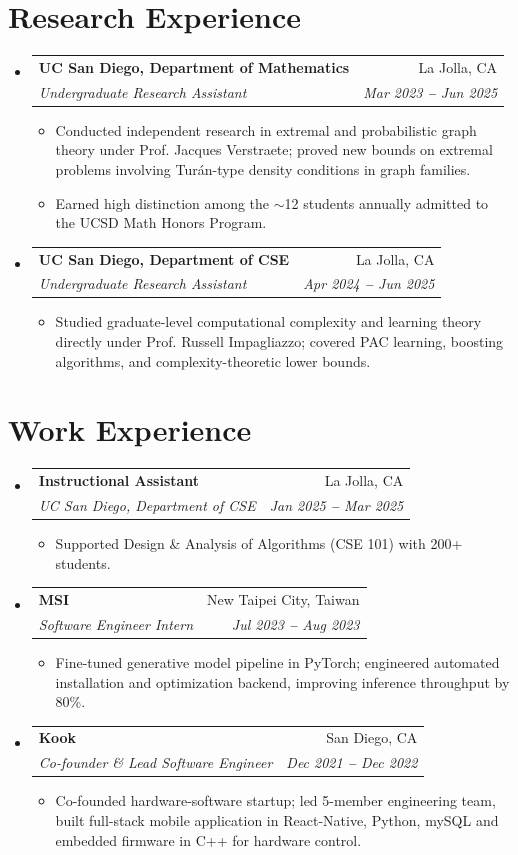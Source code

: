 \documentclass[letterpaper,11pt]{article}
\makeatletter
\newcommand{\resumeItem}[1]{
  \item\small{
    {#1 \vspace{-1pt}}
  }
}
\newcommand{\resumeSubheading}[4]{
  \vspace{-2pt}\item
    \begin{tabular*}{0.97\textwidth}[t]{l@{\extracolsep{\fill}}r}
      \textbf{#1} & #2 \\
      \textit{\small#3} & \textit{\small #4} \\
    \end{tabular*}\vspace{-2pt}
}
\newcommand{\resumeSubHeadingListStart}{\begin{itemize}[leftmargin=0.15in, label={}]}
\newcommand{\resumeSubHeadingListEnd}{\end{itemize}}
\newcommand{\resumeItemListStart}{\begin{itemize}\vspace{-2pt}}
\newcommand{\resumeItemListEnd}{\end{itemize}\vspace{-7pt}}
\makeatother
\begin{document}

\section{Research Experience}
\resumeSubHeadingListStart

  \resumeSubheading
    {UC San Diego, Department of Mathematics}{La Jolla, CA}
    {Undergraduate Research Assistant}{Mar 2023 \textbf{--} Jun 2025}
    \resumeItemListStart
      \resumeItem{Conducted independent research in extremal and probabilistic graph theory under Prof. Jacques Verstraete; proved new bounds on extremal problems involving Turán-type density conditions in graph families.}
      \resumeItem{Earned high distinction among the $\sim$12 students annually admitted to the UCSD Math Honors Program.}
    \resumeItemListEnd

  \resumeSubheading
    {UC San Diego, Department of CSE}{La Jolla, CA}
    {Undergraduate Research Assistant}{Apr 2024 \textbf{--} Jun 2025}
    \resumeItemListStart
      \resumeItem{Studied graduate-level computational complexity and learning theory directly under Prof. Russell Impagliazzo; covered PAC learning, boosting algorithms, and complexity-theoretic lower bounds.}
    \resumeItemListEnd

\resumeSubHeadingListEnd


\section{Work Experience}
\resumeSubHeadingListStart

  \resumeSubheading
    {Instructional Assistant}{La Jolla, CA}
    {UC San Diego, Department of CSE}{Jan 2025 \textbf{--} Mar 2025}
    \resumeItemListStart
      \resumeItem{Supported Design \& Analysis of Algorithms (CSE 101) with 200+ students.}
    \resumeItemListEnd

  \resumeSubheading
    {MSI}{New Taipei City, Taiwan}
    {Software Engineer Intern}{Jul 2023 \textbf{--} Aug 2023}
    \resumeItemListStart
      \resumeItem{Fine-tuned generative model pipeline in PyTorch; engineered automated installation and optimization backend, improving inference throughput by 80\%.}
    \resumeItemListEnd

  \resumeSubheading
    {Kook}{San Diego, CA}
    {Co-founder \& Lead Software Engineer}{Dec 2021 \textbf{--} Dec 2022}
    \resumeItemListStart
      \resumeItem{Co-founded hardware-software startup; led 5-member engineering team, built full-stack mobile application in React-Native, Python, mySQL and embedded firmware in C++ for hardware control.}
    \resumeItemListEnd
\resumeSubHeadingListEnd
\end{document}

